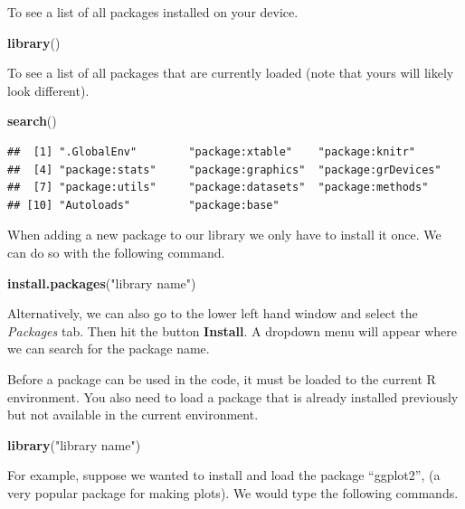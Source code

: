 \documentclass[
]{book}
\newenvironment{Shaded}{\begin{snugshade}}{\end{snugshade}}
\newcommand{\KeywordTok}[1]{\textcolor[rgb]{0.13,0.29,0.53}{\textbf{#1}}}
\newcommand{\NormalTok}[1]{#1}
\newcommand{\StringTok}[1]{\textcolor[rgb]{0.31,0.60,0.02}{#1}}
\begin{document}
To see a list of all packages installed on your device.

\begin{Shaded}
\begin{Highlighting}[]
\KeywordTok{library}\NormalTok{()}
\end{Highlighting}
\end{Shaded}

To see a list of all packages that are currently loaded (note that yours will likely look different).

\begin{Shaded}
\begin{Highlighting}[]
\KeywordTok{search}\NormalTok{()}
\end{Highlighting}
\end{Shaded}

\begin{verbatim}
##  [1] ".GlobalEnv"        "package:xtable"    "package:knitr"    
##  [4] "package:stats"     "package:graphics"  "package:grDevices"
##  [7] "package:utils"     "package:datasets"  "package:methods"  
## [10] "Autoloads"         "package:base"
\end{verbatim}

When adding a new package to our library we only have to install it once. We can do so with the following command.

\begin{Shaded}
\begin{Highlighting}[]
\KeywordTok{install.packages}\NormalTok{(}\StringTok{"library name"}\NormalTok{)}
\end{Highlighting}
\end{Shaded}

Alternatively, we can also go to the lower left hand window and select the \emph{Packages} tab. Then hit the button \textbf{Install}. A dropdown menu will appear where we can search for the package name.

Before a package can be used in the code, it must be loaded to the current R environment. You also need to load a package that is already installed previously but not available in the current environment.

\begin{Shaded}
\begin{Highlighting}[]
\KeywordTok{library}\NormalTok{(}\StringTok{"library name"}\NormalTok{)}
\end{Highlighting}
\end{Shaded}

For example, suppose we wanted to install and load the package ``ggplot2'', (a very popular package for making plots). We would type the following commands.
\end{document}
